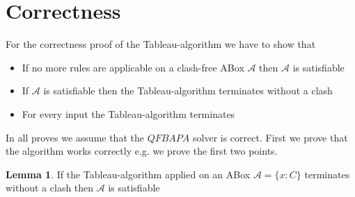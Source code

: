 \documentclass[a4paper,11pt]{scrartcl}
\theoremstyle{break}
\theoremstyle{definition}
\newtheorem{mylem}{Lemma}
\begin{document}
\section{Correctness}
For the correctness proof of the Tableau-algorithm we have to show that
\begin{itemize}
\item If no more rules are applicable on a clash-free ABox $\mathcal{A}$ then $\mathcal{A}$ is satisfiable
\item If $\mathcal{A}$ is satisfiable then the Tableau-algorithm terminates without a clash
\item For every input the Tableau-algorithm terminates
\end{itemize}
In all proves we assume that the $QFBAPA$ solver is correct. First we prove that the algorithm works correctly e.g. we prove the first two points. 
\begin{mylem}
If the Tableau-algorithm applied on an ABox $\mathcal{A}=\{x:C\}$ terminates without a clash then $\mathcal{A}$ is satisfiable
\end{mylem}
\end{document}
